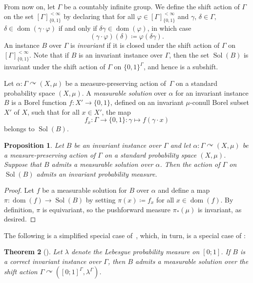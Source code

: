 \documentclass[12pt]{amsart}
\newtheorem{theo}{Theorem}[section]
\newtheorem{prop}[theo]{Proposition}
\theoremstyle{definition}
\theoremstyle{remark}
\newcommand{\0}{\emptyset}
\newcommand{\set}[1]{\{#1\}}
\newcommand{\dom}{\operatorname{dom}}
\newcommand{\acts}{\curvearrowright}
\renewcommand{\phi}{\varphi}
\numberwithin{equation}{section}
\begin{document}
	From now on, let $\Gamma$ be a countably infinite group. We define the shift action of $\Gamma$ on the set $[\Gamma]^{<\infty}_{\set{0,1}}$ by declaring that for all $\phi \in [\Gamma]^{<\infty}_{\set{0,1}}$ and $\gamma$, $\delta \in \Gamma$, $\delta \in \dom(\gamma \cdot \phi)$ if and only if $\delta\gamma \in \dom(\phi)$, in which case
	$$(\gamma \cdot \phi)(\delta) \coloneqq \phi(\delta\gamma).$$
	An instance ${B}$ over $\Gamma$ is \emph{invariant} if it is closed under the shift action of $\Gamma$ on $[\Gamma]^{<\infty}_{\set{0,1}}$. Note that if ${B}$ is an invariant instance over $\Gamma$, then the set $\operatorname{Sol}({B})$ is invariant under the shift action of $\Gamma$ on $\set{0,1}^\Gamma$, and hence is a subshift.
	
	Let $\alpha \colon \Gamma \acts (X, \mu)$ be a measure-preserving action of~$\Gamma$ on a standard probability space $(X, \mu)$. A \emph{measurable solution} over $\alpha$ for an invariant instance ${B}$ is a Borel function $f \colon X' \to \set{0,1}$, defined on an invariant $\mu$-conull Borel subset $X'$ of $X$, such that for all $x \in X'$, the map 
	$$f_x \colon \Gamma \to \set{0,1} \colon \gamma \mapsto f(\gamma \cdot x)$$ belongs to $\operatorname{Sol}({B})$.
	
	\begin{prop}
		Let ${B}$ be an invariant instance over $\Gamma$ and let $\alpha \colon \Gamma \acts (X, \mu)$ be a measure-preserving action of $\Gamma$ on a standard probability space $(X, \mu)$. Suppose that ${B}$ admits a measurable solution over $\alpha$. Then the action of $\Gamma$ on $\operatorname{Sol}({B})$ admits an invariant probability measure.
	\end{prop}
	\begin{proof}
		Let $f$ be a measurable solution for ${B}$ over $\alpha$ and define a map $\pi \colon \dom(f) \to \operatorname{Sol}({B})$ by setting $\pi(x) \coloneqq f_x$ for all $x \in \dom(f)$. By definition, $\pi$ is equivariant, so the pushforward measure $\pi_\ast(\mu)$ is invariant, as desired.
	\end{proof}
	
	The following is a simplified special case of~\cite[Lemma~5.17]{B}, which, in turn, is a special case of \cite[Theorem~5.4]{B}:
	
	\begin{theo}[{\cite[Lemma~5.17]{B}}]\label{theo:meas_LLL}
		Let $\lambda$ denote the Lebesgue probability measure on $[0;1]$. If ${B}$ is a correct invariant instance over $\Gamma$, then ${B}$ admits a measurable solution over the shift action $\Gamma \acts ([0;1]^\Gamma, \lambda^\Gamma)$.
	\end{theo}
	
\end{document}

